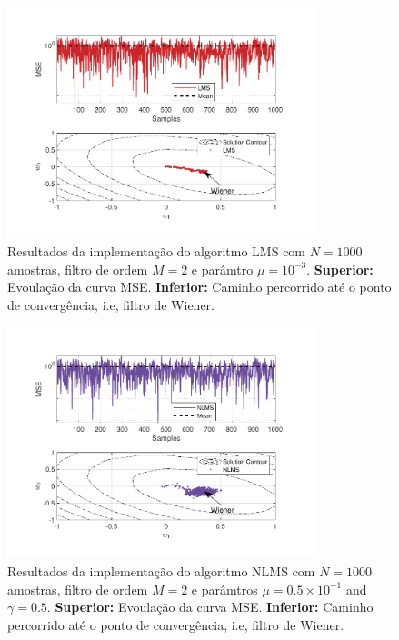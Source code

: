 \begin{figure}[!htp]
    \centering
    \includegraphics[width=0.80\textwidth]{fig/hw3p4-lms.pdf}
    \caption{Resultados da implementação do algoritmo LMS com $N = 1000$ amostras, filtro de ordem $M = 2$ e parâmtro $\mu = 10^{-3}$. \textbf{Superior:} Evoulação da curva MSE. \textbf{Inferior:} Caminho percorrido até o ponto de convergência, i.e, filtro de Wiener.}
    \label{fig:hw3p4-lms}
\end{figure}

\begin{figure}[!htp]
    \centering
    \includegraphics[width=0.80\textwidth]{fig/hw3p4-nlms.pdf}
    \caption{Resultados da implementação do algoritmo NLMS com $N = 1000$ amostras, filtro de ordem $M = 2$ e parâmtros $\mu = 0.5 \times 10^{-1}$ and $\gamma = 0.5 $. \textbf{Superior:} Evoulação da curva MSE. \textbf{Inferior:} Caminho percorrido até o ponto de convergência, i.e, filtro de Wiener.}
    \label{fig:hw3p4-nlms}
\end{figure}


